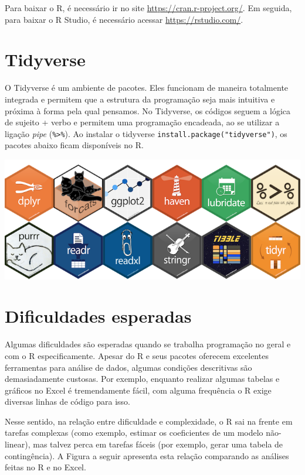 \documentclass[
]{book}
\begin{document}
Para baixar o R, é necessário ir no site \url{https://cran.r-project.org/}. Em seguida, para baixar o R Studio, é necessário acessar \url{https://rstudio.com/}.

\hypertarget{tidyverse}{%
\section{Tidyverse}\label{tidyverse}}

O Tidyverse é um ambiente de pacotes. Eles funcionam de maneira totalmente integrada e permitem que a estrutura da programação seja mais intuitiva e próxima à forma pela qual pensamos. No Tidyverse, os códigos seguem a lógica de sujeito + verbo e permitem uma programação encadeada, ao se utilizar a ligação \emph{pipe} (\texttt{\%\textgreater{}\%}). Ao instalar o tidyverse \texttt{install.package("tidyverse")}, os pacotes abaixo ficam disponíveis no R.

\includegraphics{./img/tidyverse_website.PNG}

\hypertarget{dificuldades-esperadas}{%
\section{Dificuldades esperadas}\label{dificuldades-esperadas}}

Algumas dificuldades são esperadas quando se trabalha programação no geral e com o R especificamente. Apesar do R e seus pacotes oferecem excelentes ferramentas para análise de dados, algumas condições descritivas são demasiadamente custosas. Por exemplo, enquanto realizar algumas tabelas e gráficos no Excel é tremendamente fácil, com alguma frequência o R exige diversas linhas de código para isso.

Nesse sentido, na relação entre dificuldade e complexidade, o R sai na frente em tarefas complexas (como exemplo, estimar os coeficientes de um modelo não-linear), mas talvez perca em tarefas fáceis (por exemplo, gerar uma tabela de contingência). A Figura a seguir apresenta esta relação comparando as análises feitas no R e no Excel.
\end{document}
